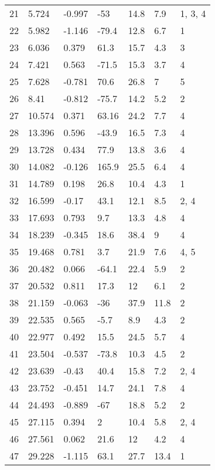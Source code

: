 \begin{longtable}{|l|l|l|l|l|l|l|}
        21 & 5.724 & -0.997 & -53 & 14.8 & 7.9 & 1, 3, 4 \\ 
        22 & 5.982 & -1.146 & -79.4 & 12.8 & 6.7 & 1 \\ 
        23 & 6.036 & 0.379 & 61.3 & 15.7 & 4.3 & 3 \\ 
        24 & 7.421 & 0.563 & -71.5 & 15.3 & 3.7 & 4 \\ 
        25 & 7.628 & -0.781 & 70.6 & 26.8 & 7 & 5 \\ 
        26 & 8.41 & -0.812 & -75.7 & 14.2 & 5.2 & 2 \\ 
        27 & 10.574 & 0.371 & 63.16 & 24.2 & 7.7 & 4 \\ 
        28 & 13.396 & 0.596 & -43.9 & 16.5 & 7.3 & 4 \\ 
        29 & 13.728 & 0.434 & 77.9 & 13.8 & 3.6 & 4 \\ 
        30 & 14.082 & -0.126 & 165.9 & 25.5 & 6.4 & 4 \\ 
        31 & 14.789 & 0.198 & 26.8 & 10.4 & 4.3 & 1 \\ 
        32 & 16.599 & -0.17 & 43.1 & 12.1 & 8.5 & 2, 4 \\ 
        33 & 17.693 & 0.793 & 9.7 & 13.3 & 4.8 & 4 \\ 
        34 & 18.239 & -0.345 & 18.6 & 38.4 & 9 & 4 \\ 
        35 & 19.468 & 0.781 & 3.7 & 21.9 & 7.6 & 4, 5 \\ 
        36 & 20.482 & 0.066 & -64.1 & 22.4 & 5.9 & 2 \\ 
        37 & 20.532 & 0.811 & 17.3 & 12 & 6.1 & 2 \\ 
        38 & 21.159 & -0.063 & -36 & 37.9 & 11.8 & 2 \\ 
        39 & 22.535 & 0.565 & -5.7 & 8.9 & 4.3 & 2 \\ 
        40 & 22.977 & 0.492 & 15.5 & 24.5 & 5.7 & 4 \\ 
        41 & 23.504 & -0.537 & -73.8 & 10.3 & 4.5 & 2 \\ 
        42 & 23.639 & -0.43 & 40.4 & 15.8 & 7.2 & 2, 4 \\ 
        43 & 23.752 & -0.451 & 14.7 & 24.1 & 7.8 & 4 \\ 
        44 & 24.493 & -0.889 & -67 & 18.8 & 5.2 & 2 \\ 
        45 & 27.115 & 0.394 & 2 & 10.4 & 5.8 & 2, 4 \\ 
        46 & 27.561 & 0.062 & 21.6 & 12 & 4.2 & 4 \\ 
        47 & 29.228 & -1.115 & 63.1 & 27.7 & 13.4 & 1 \\ 

\end{longtable}
